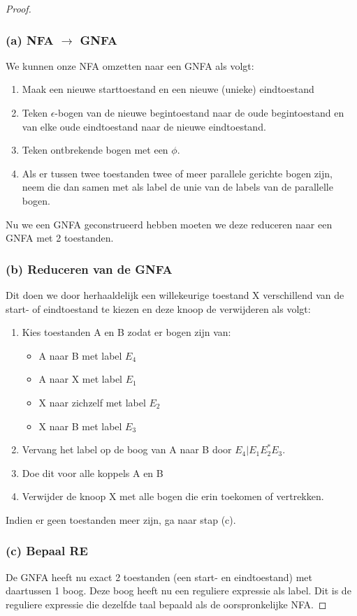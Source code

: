 \begin{proof}
\subsubsection*{(a) NFA $\rightarrow$ GNFA}
We kunnen onze NFA omzetten naar een GNFA als volgt:
\begin{enumerate}
\item Maak een nieuwe starttoestand en een nieuwe (unieke) eindtoestand
\item Teken $\epsilon$-bogen van de nieuwe begintoestand naar de oude begintoestand en van elke oude eindtoestand naar de nieuwe eindtoestand.
\item Teken ontbrekende bogen met een $\phi$.
\item Als er tussen twee toestanden twee of meer parallele gerichte bogen zijn, neem die dan samen met als label de unie van de labels van de parallelle bogen.
\end{enumerate}
Nu we een GNFA geconstrueerd hebben moeten we deze reduceren naar een GNFA met 2 toestanden.

\subsubsection*{(b) Reduceren van de GNFA}
Dit doen we door herhaaldelijk een willekeurige toestand X verschillend van de start- of eindtoestand te kiezen en deze knoop de verwijderen als volgt:
\begin{enumerate}
\item Kies toestanden A en B zodat er bogen zijn van: 
\begin{itemize}
\item A naar B met label $E_4$
\item A naar X met label $E_1$
\item X naar zichzelf met label $E_2$
\item X naar B met label $E_3$
\end{itemize}
\item Vervang het label op de boog van A naar B door $E_4 | E_1 E_2^* E_3$.
\item Doe dit voor alle koppels A en B
\item Verwijder de knoop X met alle bogen die erin toekomen of vertrekken.
\end{enumerate}
Indien er geen toestanden meer zijn, ga naar stap (c).

\subsubsection*{(c) Bepaal RE}
De GNFA heeft nu exact 2 toestanden (een start- en eindtoestand) met daartussen 1 boog. Deze boog heeft nu een reguliere expressie als label. Dit is de reguliere expressie die dezelfde taal bepaald als de oorspronkelijke NFA.
\end{proof}
